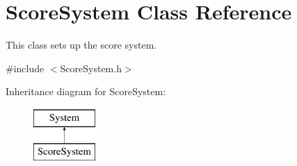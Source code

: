 \hypertarget{class_score_system}{}\section{Score\+System Class Reference}
\label{class_score_system}


This class sets up the score system.  




{\ttfamily \#include $<$Score\+System.\+h$>$}

Inheritance diagram for Score\+System\+:\begin{figure}[H]
\begin{center}
\leavevmode
\includegraphics[height=2.000000cm]{class_score_system}
\end{center}
\end{figure}

